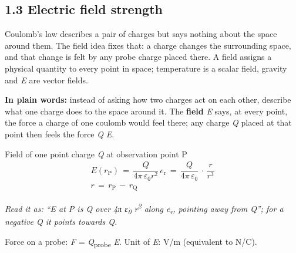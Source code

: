 \documentclass[11pt]{article}
\begin{document}
\begin{keepsection}
\section{1.3 Electric field strength}

Coulomb’s law describes a pair of charges but says nothing about the space around them. The field idea fixes that: a charge changes the surrounding space, and that change is felt by any probe charge placed there. A field assigns a physical quantity to every point in space; temperature is a scalar field, gravity and \textit{E} are vector fields.

\begin{plainbox}\textbf{In plain words:} instead of asking how two charges act on each other, describe what one charge does to the space around it. The \textbf{field} \textit{E} says, at every point, the force a charge of one coulomb would feel there; any charge \textit{Q} placed at that point then feels the force \textit{Q} \textit{E}.\end{plainbox}

\begin{equationcard}{Field of one point charge \textit{Q} at observation point P}
\[ \begin{gathered} {E}({r}_{\mathrm{P}})\, =\, \dfrac{{Q}}{4π\, ε_{0}{r}^{2}}\, {e}_{\mathrm{r}}\, =\, \dfrac{{Q}}{4π\, ε_{0}}\, \cdot \, \dfrac{{r}}{{r}^{3}} \\ {r}\, =\, {r}_{\mathrm{P}}\, -\, {r}_{\mathrm{Q}} \end{gathered} \]
{\small \emph{Read it as: “E at P is Q over 4π ε\textsubscript{0} r\textsuperscript{2} along e\textsubscript{r}, pointing away from Q”; for a negative Q it points towards Q.}\par Force on a probe: \textit{F} = \textit{Q}\textsubscript{probe} \textit{E}. Unit of \textit{E}: V/m (equivalent to N/C).}
\end{equationcard}


\end{keepsection}
\end{document}
